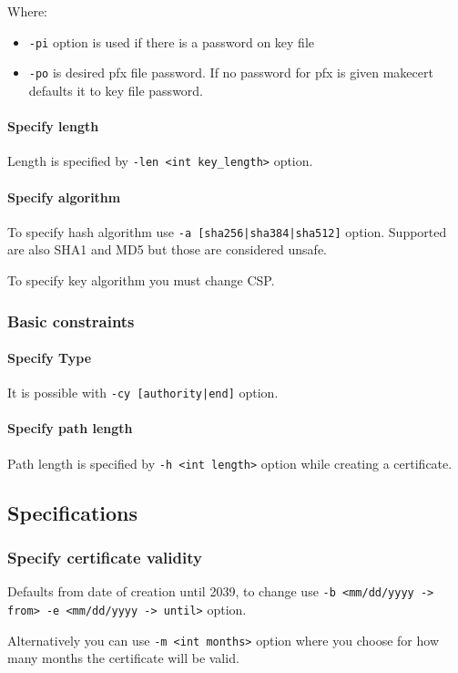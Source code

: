 \documentclass[10pt, a4paper]{report}
\begin{document}
{Where:
\begin{itemize}
\item \verb+-pi+ option is used if there is a password on key file
\item \verb+-po+ is desired pfx file password. If no password for pfx is given makecert defaults it to key file password.
\end{itemize}

      \paragraph{Specify length}
Length is specified by \verb+-len <int key_length>+ option.
      \paragraph{Specify algorithm}
To specify hash algorithm use \verb+-a [sha256|sha384|sha512]+ option. Supported are also SHA1 and MD5 but those are considered unsafe.

To specify key algorithm you must change CSP.
    \subsubsection{Basic constraints}
    
      \paragraph{Specify Type}
It is possible with \verb+-cy [authority|end]+ option.

      \paragraph{Specify path length}
Path length is specified by \verb+-h <int length>+ option while creating a certificate.

  \subsection{Specifications}
  
    \subsubsection{Specify certificate validity}
Defaults from date of creation until 2039, to change use \verb+-b <mm/dd/yyyy -> from> -e <mm/dd/yyyy -> until>+ option.

Alternatively you can use \verb+-m <int months>+ option where you choose for how many months the certificate will be valid.

}
\end{document}
